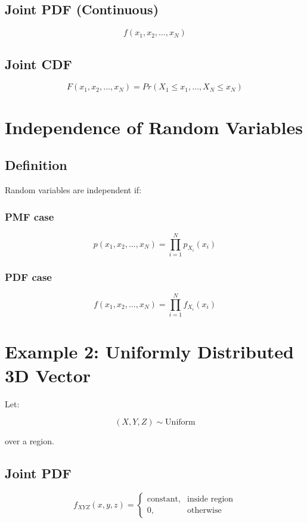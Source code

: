 \documentclass[12pt]{article}
\begin{document}
\subsection*{Joint PDF (Continuous)}

\[
f(x_1, x_2, \dots, x_N)
\]

\subsection*{Joint CDF}

\[
F(x_1, x_2, \dots, x_N)
= Pr(X_1 \le x_1, \dots, X_N \le x_N)
\]

\section*{Independence of Random Variables}

\subsection*{Definition}

Random variables are independent if:

\subsubsection*{PMF case}

\[
p(x_1, x_2, \dots, x_N)
=
\prod_{i=1}^{N} p_{X_i}(x_i)
\]

\subsubsection*{PDF case}

\[
f(x_1, x_2, \dots, x_N)
=
\prod_{i=1}^{N} f_{X_i}(x_i)
\]

\section*{Example 2: Uniformly Distributed 3D Vector}

Let:

\[
(X,Y,Z) \sim \text{Uniform}
\]

over a region.

\subsection*{Joint PDF}

\[
f_{XYZ}(x,y,z) =
\begin{cases}
\text{constant}, & \text{inside region} \\
0, & \text{otherwise}
\end{cases}
\]
\end{document}
